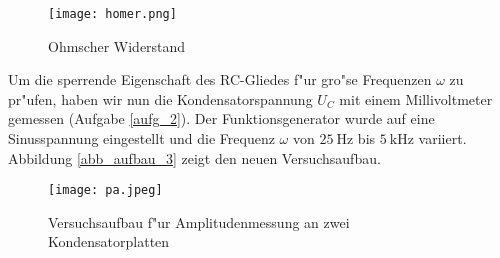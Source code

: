 \documentclass{scrartcl}
\begin{document}
			\begin{figure}[ht]
				\centering
				\texttt{[image: homer.png]}
					\caption {Ohmscher Widerstand}
			\end{figure}

			Um die sperrende Eigenschaft des RC-Gliedes f"ur gro"se Frequenzen $\omega$ zu pr"ufen, haben wir nun die Kondensatorspannung $U_C$ mit einem Millivoltmeter gemessen (Aufgabe \ref{aufg_2}).
			Der Funktions\-generator wurde auf eine Sinusspannung eingestellt und die Frequenz $\omega$ von $\SI{25}{\hertz}$ bis $\SI{5}{\kilo\hertz}$ variiert. Abbildung \ref{abb_aufbau_3} zeigt den neuen Versuchsaufbau. \\

			\begin{figure}[ht]
				\centering
				\texttt{[image: pa.jpeg]}
					\caption {Versuchsaufbau f"ur Amplitudenmessung an zwei Kondensatorplatten}
			\end{figure}
\end{document}

